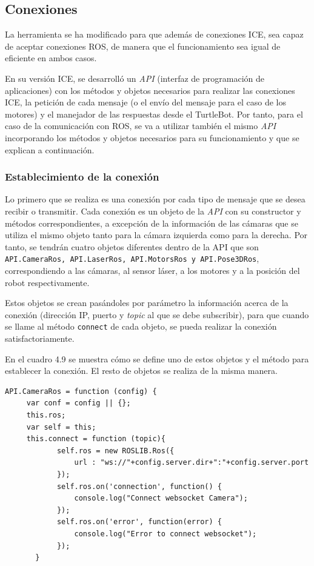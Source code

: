 \subsection{Conexiones}
La herramienta se ha modificado para que además de conexiones ICE, sea capaz de aceptar conexiones ROS, de manera que el funcionamiento sea igual de eficiente en ambos casos.

En su versión ICE, se desarrolló un \textit{API} (interfaz de programación de aplicaciones) con los métodos y objetos necesarios para realizar las conexiones ICE, la petición de cada mensaje (o el envío del mensaje para el caso de los motores) y el manejador de las respuestas desde el TurtleBot. Por tanto, para el caso de la comunicación con ROS, se va a utilizar también el mismo \textit{API} incorporando los métodos y objetos necesarios para su funcionamiento y que se explican a continuación.

\subsubsection{Establecimiento de la conexión}
Lo primero que se realiza es una conexión por cada tipo de mensaje que se desea recibir o transmitir. Cada conexión es un objeto de la \textit{API} con su constructor y métodos correspondientes, a excepción de la información de las cámaras que se utiliza el mismo objeto tanto para la cámara izquierda como para la derecha. Por tanto, se tendrán cuatro objetos diferentes dentro de la API que son \texttt{API.CameraRos, API.LaserRos, API.MotorsRos y API.Pose3DRos}, correspondiendo a las cámaras, al sensor láser, a los motores y a la posición del robot respectivamente.

Estos objetos se crean pasándoles por parámetro la información acerca de la conexión (dirección IP, puerto y \textit{topic} al que se debe subscribir), para que cuando se llame al método \texttt{connect} de cada objeto, se pueda realizar la conexión satisfactoriamente.

En el cuadro 4.9 se muestra cómo se define uno de estos objetos y el método para establecer la conexión. El resto de objetos se realiza de la misma manera.

\begin{lstlisting}[caption= Establecimiento de la conexión ROS , label=cod.conexionTurtleBot]
API.CameraRos = function (config) {
	 var conf = config || {};
	 this.ros;
	 var self = this;
   	 this.connect = function (topic){
            self.ros = new ROSLIB.Ros({
                url : "ws://"+config.server.dir+":"+config.server.port
            });
            self.ros.on('connection', function() {
                console.log("Connect websocket Camera");
            }); 
            self.ros.on('error', function(error) {
                console.log("Error to connect websocket");
            });
       }
\end{lstlisting}


